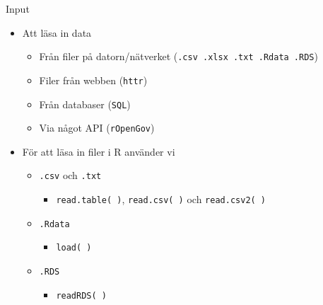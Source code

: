 \documentclass[
  11pt,
  ignorenonframetext,
]{beamer}
\providecommand{\tightlist}{%
  \setlength{\itemsep}{0pt}\setlength{\parskip}{0pt}}
\begin{document}
\begin{frame}{Input}
\label{input}
\begin{itemize}
\tightlist
\item
  Att läsa in data

  \begin{itemize}
  \tightlist
  \item
    Från filer på datorn/nätverket
    (\texttt{.csv .xlsx .txt .Rdata .RDS})
  \item
    Filer från webben (\texttt{httr})
  \item
    Från databaser (\texttt{SQL})
  \item
    Via något API (\texttt{rOpenGov})
  \end{itemize}
\end{itemize}

\pause

\begin{itemize}
\tightlist
\item
  För att läsa in filer i R använder vi

  \begin{itemize}
  \tightlist
  \item
    \texttt{.csv} och \texttt{.txt}

    \begin{itemize}
    \tightlist
    \item
      \texttt{read.table( )}, \texttt{read.csv( )} och
      \texttt{read.csv2( )}
    \end{itemize}
  \item
    \texttt{.Rdata}

    \begin{itemize}
    \tightlist
    \item
      \texttt{load( )}
    \end{itemize}
  \item
    \texttt{.RDS}

    \begin{itemize}
    \tightlist
    \item
      \texttt{readRDS( )}
    \end{itemize}
  \end{itemize}
\end{itemize}
\end{frame}
\end{document}
